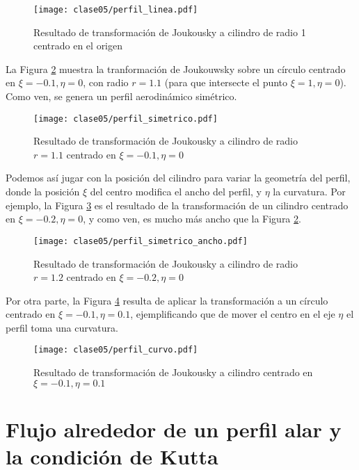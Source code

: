 \begin{figure}[h!]
\centering
\texttt{[image: clase05/perfil\_linea.pdf]}
\caption{Resultado de transformación de Joukousky a cilindro de radio 1 centrado en el origen}\label{fig:perfil_linea}
\end{figure}


La Figura \ref{fig:perfil_simetrico} muestra la tranformación de Joukouwsky sobre un círculo centrado en $\xi=-0.1, \eta=0$, con radio $r=1.1$ (para que intersecte el punto $\xi=1, \eta=0$).
Como ven, se genera un perfil aerodinámico simétrico.
%
\begin{figure}[h!]
\centering
\texttt{[image: clase05/perfil\_simetrico.pdf]}
\caption{Resultado de transformación de Joukousky a cilindro de radio $r=1.1$ centrado en $\xi=-0.1, \eta=0$}\label{fig:perfil_simetrico}
\end{figure}
%
Podemos así jugar con la posición del cilindro para variar la geometría del perfil, donde la posición $\xi$ del centro modifica el ancho del perfil, y $\eta$ la curvatura.
Por ejemplo, la Figura \ref{fig:perfil_simetrico_ancho} es el resultado de la transformación de un cilindro centrado en $\xi=-0.2, \eta=0$, y como ven, es mucho más ancho que la Figura \ref{fig:perfil_simetrico}.
%
\begin{figure}[h!]
\centering
\texttt{[image: clase05/perfil\_simetrico\_ancho.pdf]}
\caption{Resultado de transformación de Joukousky a cilindro de radio $r=1.2$ centrado en $\xi=-0.2, \eta=0$}\label{fig:perfil_simetrico_ancho}
\end{figure}

Por otra parte, la Figura \ref{fig:perfil_curvo} resulta de aplicar la transformación a un círculo centrado en $\xi=-0.1, \eta=0.1$, ejemplificando que de mover el centro en el eje $\eta$ el perfil toma una curvatura.
%
\begin{figure}[h!]
\centering
\texttt{[image: clase05/perfil\_curvo.pdf]}
\caption{Resultado de transformación de Joukousky a cilindro centrado en $\xi=-0.1, \eta=0.1$}\label{fig:perfil_curvo}
\end{figure}

\section*{Flujo alrededor de un perfil alar y la condición de Kutta}

